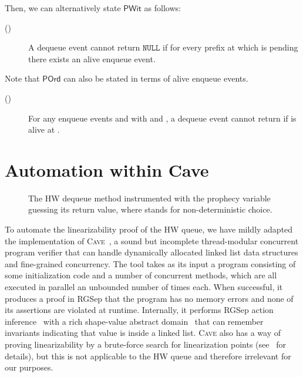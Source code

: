 \documentclass{LMCS}
\newcommand{\NULL}{\ensuremath{\mathtt{NULL}}}
\newcommand{\POrd}{\ensuremath{\mathsf{POrd}}}
\newcommand{\PWit}{\ensuremath{\mathsf{PWit}}}
\begin{document}
\noindent
Then, we can alternatively state {\PWit} as follows:
\begin{description}
\item[()] A dequeue event  cannot return {\NULL} if for every prefix  at which  is pending there exists an alive enqueue event.
\end{description}
Note that {\POrd} can also be stated in terms of alive enqueue events. 
\begin{description}
\item[()] For any enqueue events  and  with  and \mbox{},
a dequeue event cannot return  if  is alive at .
\end{description}

\section{Automation within Cave}
\label{sec:cave}

\begin{figure}[t]
\begin{algorithmic}
 \Procedure{}{}
   \State 
  \State 

  \EndFor
 \EndWhile
 \EndProcedure
\end{algorithmic}
\caption{The HW dequeue method instrumented with the prophecy variable  guessing
its return value, where  stands for non-deterministic choice.}
\label{fig:instr-deq}
\end{figure}

To automate the linearizability proof of the HW queue, we have mildly adapted
the implementation of \textsc{Cave}~\cite{Vaf2010}, a sound but incomplete
thread-modular concurrent program verifier that can handle dynamically
allocated linked list data structures and fine-grained concurrency.
The tool takes as its input a program consisting of some initialization code
and a number of concurrent methods, which are all executed in parallel an unbounded
number of times each. When successful, it produces a proof in RGSep that the
program has no memory errors and none of its assertions are violated at runtime.
Internally, it performs RGSep action inference~\cite{Vaf2010a} with a rich
shape-value abstract domain~\cite{Vaf2009} that can remember invariants 
indicating that value  is inside a linked list.
\textsc{Cave} also has a way of proving linearizability by a brute-force search
for linearization points (see~\cite{Vaf2010} for details), but this is not
applicable to the HW queue and therefore irrelevant for our purposes.
\end{document}
